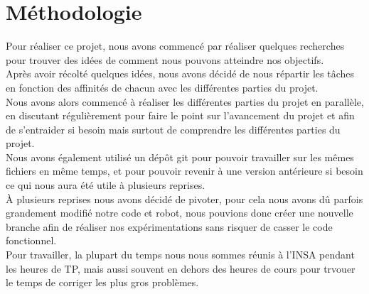 \chapter{Méthodologie}
    Pour réaliser ce projet, nous avons commencé par réaliser quelques recherches pour trouver des idées de comment nous pouvons atteindre nos objectifs.
    \\
    Après avoir récolté quelques idées, nous avons décidé de nous répartir les tâches en fonction des affinités de chacun avec les différentes parties du projet.
    \\
    Nous avons alors commencé à réaliser les différentes parties du projet en parallèle, en discutant régulièrement pour faire le point sur l'avancement du projet et afin de s'entraider si besoin mais surtout de comprendre les différentes parties du projet.
    \\
    Nous avons également utilisé un dépôt git pour pouvoir travailler sur les mêmes fichiers en même temps, et pour pouvoir revenir à une version antérieure si besoin ce qui nous aura été utile à plusieurs reprises.
    \\
    À plusieurs reprises nous avons décidé de pivoter, pour cela nous avons dû parfois grandement modifié notre code et robot, nous pouvions donc créer une nouvelle branche afin de réaliser nos expérimentations sans risquer de casser le code fonctionnel.
    \\
    Pour travailler, la plupart du temps nous nous sommes réunis à l'INSA pendant les heures de TP, mais aussi souvent en dehors des heures de cours pour trvouer le temps de corriger les plus gros problèmes.
    \\

